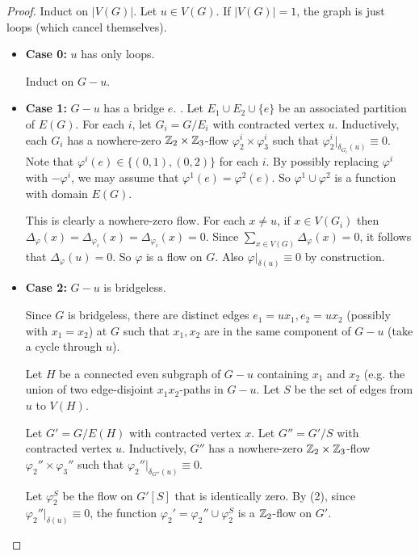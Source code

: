 \documentclass[main.tex]{subfiles}
\begin{document}
\begin{proof} %
  Induct on $|V(G)|$.
  Let $u\in V(G)$.
  If $|V(G)| = 1$, the graph is just loops (which cancel themselves).
  \begin{itemize}
    \item \textbf{Case 0:} $u$ has only loops.

      Induct on $G - u$.

    \item \textbf{Case 1:} $G - u$ has a bridge $e$.
.
      Let $E_1\cup E_2\cup\{e\}$ be an associated partition of $E(G)$.
      For each $i$, let $G_i = G/E_i$ with contracted vertex $u$.
      Inductively, each $G_i$ has a nowhere-zero $\mathbb Z_2\times\mathbb Z_3$-flow
      $\varphi^i_2\times\varphi^i_3$ such that
      $\varphi_2^i|_{\delta_{G_i}(u)}\equiv 0$.
      Note that $\varphi^i(e)\in\{(0,1),(0,2)\}$ for each $i$.
      By possibly replacing $\varphi^i$ with $-\varphi^i$, we may assume that
      $\varphi^1(e) = \varphi^2(e)$.
      So $\varphi^1\cup\varphi^2$ is a function with domain $E(G)$.

      This is clearly a nowhere-zero flow.
      For each $x\neq u$, if $x\in V(G_i)$ then
      $\Delta_\varphi(x) = \Delta_{\varphi_i}(x) = \Delta_{\varphi_i}(x) = 0$.
      Since $\sum_{x\in V(G)}\Delta_\varphi(x) = 0$, it follows that
      $\Delta_{\varphi}(u) = 0$.
      So $\varphi$ is a flow on $G$.
      Also $\varphi|_{\delta(u)}\equiv 0$ by construction.

    \item \textbf{Case 2:} $G - u$ is bridgeless.

      Since $G$ is bridgeless, there are distinct edges $e_1 = ux_1, e_2 = ux_2$
      (possibly with $x_1 = x_2$) at $G$ such that $x_1,x_2$ are in the same
      component of $G - u$ (take a cycle through $u$).

      Let $H$ be a connected even subgraph of $G - u$ containing $x_1$ and $x_2$
      (e.g. the union of two edge-disjoint $x_1x_2$-paths in $G - u$.
      Let $S$ be the set of edges from $u$ to $V(H)$.

      Let $G' = G/E(H)$ with contracted vertex $x$.
      Let $G'' = G'/S$ with contracted vertex $u$.
      Inductively, $G''$ has a nowhere-zero $\mathbb Z_2\times\mathbb Z_3$-flow
      $\varphi_2''\times\varphi_3''$ such that
      $\varphi_2''|_{\delta_{G''}(u)}\equiv 0$.

      Let $\varphi_2^S$ be the flow on $G'[S]$ that is identically zero.
      By (2), since $\varphi_2''|_{\delta(u)}\equiv 0$, the function
      $\varphi_2' = \varphi_2''\cup\varphi_2^S$ is a $\mathbb Z_2$-flow on $G'$.


\end{itemize}
\end{proof}
\end{document}
